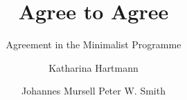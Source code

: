 \title{Agree  to  Agree}
\subtitle{Agreement  in  the  Minimalist  Programme}  
\author{Katharina  Hartmann \and Johannes  Mursell  \lastand  Peter  W.  Smith}
\renewcommand{\lsISBNdigital}{000-0-000000-00-0}
\renewcommand{\lsISBNhardcover}{000-0-000000-00-0} 
\renewcommand{\lsSeries}{ogs}  
\renewcommand{\lsSeriesNumber}{000} 
\renewcommand{\lsID}{165} 
